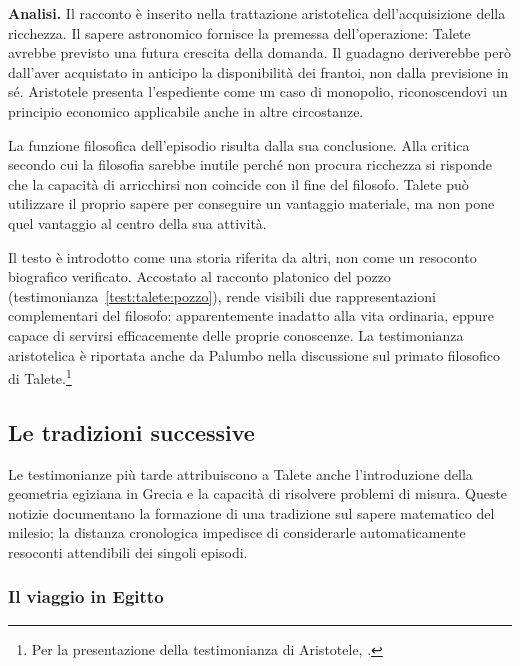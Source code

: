 

\noindent\textbf{Analisi.}
Il racconto è inserito nella trattazione aristotelica dell'acquisizione della ricchezza. Il sapere astronomico fornisce la premessa dell'operazione: Talete avrebbe previsto una futura crescita della domanda. Il guadagno deriverebbe però dall'aver acquistato in anticipo la disponibilità dei frantoi, non dalla previsione in sé. Aristotele presenta l'espediente come un caso di monopolio, riconoscendovi un principio economico applicabile anche in altre circostanze.

La funzione filosofica dell'episodio risulta dalla sua conclusione. Alla critica secondo cui la filosofia sarebbe inutile perché non procura ricchezza si risponde che la capacità di arricchirsi non coincide con il fine del filosofo. Talete può utilizzare il proprio sapere per conseguire un vantaggio materiale, ma non pone quel vantaggio al centro della sua attività.

Il testo è introdotto come una storia riferita da altri, non come un resoconto biografico verificato. Accostato al racconto platonico del pozzo (testimonianza~\ref{test:talete:pozzo}), rende visibili due rappresentazioni complementari del filosofo: apparentemente inadatto alla vita ordinaria, eppure capace di servirsi efficacemente delle proprie conoscenze. La testimonianza aristotelica è riportata anche da Palumbo nella discussione sul primato filosofico di Talete.\footnote{Per la presentazione della testimonianza di Aristotele, \cite[18]{palumbo2015}.}

\subsection{Le tradizioni successive}

Le testimonianze più tarde attribuiscono a Talete anche l'introduzione della geometria egiziana in Grecia e la capacità di risolvere problemi di misura. Queste notizie documentano la formazione di una tradizione sul sapere matematico del milesio; la distanza cronologica impedisce di considerarle automaticamente resoconti attendibili dei singoli episodi.

\subsubsection{Il viaggio in Egitto}

